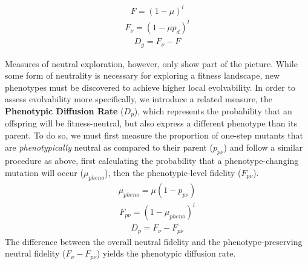 \documentclass[PhD]{msu-thesis}
\begin{document}
\begin{eqnarray}
\label{eq:fidelity}
	F = (1 - \mu)^l
\end{eqnarray}
\begin{eqnarray}
\label{eq:neutral_fidelity}
	F_\nu = (1 - \mu p_d)^l
\end{eqnarray}
\begin{eqnarray}
\label{eq:genomic_diffusion_rate}
	D_g = F_\nu - F
\end{eqnarray}




Measures of neutral exploration, however, only show part of the picture. While some form of neutrality is necessary for exploring a fitness landscape, new phenotypes must be discovered to achieve higher local evolvability. In order to assess evolvability more specifically, we introduce a related measure, the \textbf{Phenotypic Diffusion Rate} ($D_p$), which represents the probability that an offspring will be fitness-neutral, but also express a different phenotype than its parent. To do so, we must first measure the proportion of one-step mutants that are \textit{phenotypically} neutral as compared to their parent ($p_{p\nu}$) and follow a similar procedure as above, first calculating the probability that a phenotype-changing mutation will occur ($\mu_{pheno}$), then the phenotypic-level fidelity ($F_{p\nu}$).
\begin{eqnarray}
\label{eq:phenotypic_mutation_rate}
	\mu_{pheno} = \mu (1- p_{p\nu})
\end{eqnarray}
\begin{eqnarray}
\label{eq:phenotypic_fidelity}
	F_{p\nu} = (1 - \mu_{pheno})^l
\end{eqnarray}
\begin{eqnarray}
\label{eq:phenotypic_diffusion_rate}
	D_p = F_\nu - F_{p\nu}
\end{eqnarray}
The difference between the overall neutral fidelity and the phenotype-preserving neutral fidelity ($F_\nu - F_{p\nu}$) yields the phenotypic diffusion rate.
\end{document}
